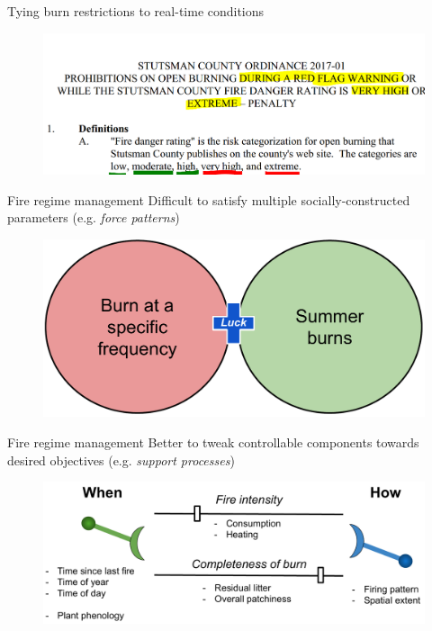 \documentclass[11pt]{beamer}
\begin{document}
\begin{frame}{Tying burn restrictions to real-time conditions}
	\begin{center}
		\begin{figure}
			\includegraphics[width=1\linewidth]{figs/StutsmanOrdinance} 
		\end{figure}
	\end{center}
\end{frame}







\begin{frame}{Fire regime management}
	Difficult to satisfy multiple socially-constructed parameters (e.g. \emph{force patterns})
	\begin{center}
		\begin{figure}
			\includegraphics[width=1\linewidth]{figs/venn} 
		\end{figure}
	\end{center}
\end{frame}

\begin{frame}{Fire regime management}
	\vspace{-3em}
	Better to tweak controllable components towards desired objectives (e.g. \emph{support processes})
	\begin{center}
		\begin{figure}
			\includegraphics[width=1\linewidth]{figs/levers} 
		\end{figure}
	\end{center}
\end{frame}
\end{document}
